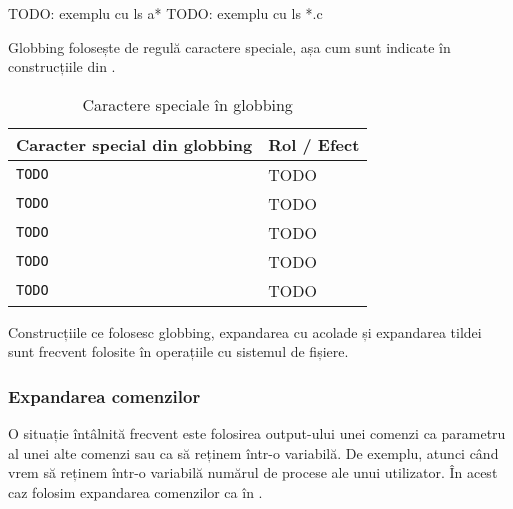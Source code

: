 \begin{screen}[caption={Folosirea globbing în shell},label={lst:cli:globbing}]
TODO: exemplu cu ls a*
TODO: exemplu cu ls *.c
\end{screen}

Globbing folosește de regulă caractere speciale, așa cum sunt indicate în construcțiile din .

\begin{table}[!htb]
  \caption{Caractere speciale în globbing}
  \begin{center}
    \begin{tabular}{ p{} p{} }
      \toprule
        \textbf{Caracter special din globbing} &
        \textbf{Rol / Efect} \\
      \midrule
        \texttt{TODO} &
        TODO \\

        \texttt{TODO} &
        TODO \\

        \texttt{TODO} &
        TODO \\

        \texttt{TODO} &
        TODO \\

        \texttt{TODO} &
        TODO \\

      \bottomrule
    \end{tabular}
    \label{tab:cli:key-bindings}
  \end{center}
\end{table}

Construcțiile ce folosesc globbing, expandarea cu acolade și expandarea tildei
sunt frecvent folosite în operațiile cu sistemul de fișiere.

\subsubsection{Expandarea comenzilor}
\label{sec:cli-comm-expansion}

O situație întâlnită frecvent este folosirea output-ului unei comenzi ca
parametru al unei alte comenzi sau ca să reținem într-o variabilă. De exemplu,
atunci când vrem să reținem într-o variabilă numărul de procese ale unui utilizator. În acest caz folosim expandarea comenzilor ca în .


